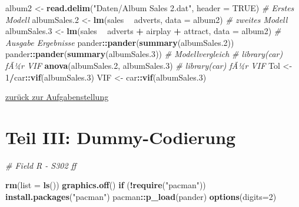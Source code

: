 \documentclass[]{article}
\newenvironment{Shaded}{\begin{snugshade}}{\end{snugshade}}
\newcommand{\CommentTok}[1]{\textcolor[rgb]{0.56,0.35,0.01}{\textit{#1}}}
\newcommand{\ControlFlowTok}[1]{\textcolor[rgb]{0.13,0.29,0.53}{\textbf{#1}}}
\newcommand{\DataTypeTok}[1]{\textcolor[rgb]{0.13,0.29,0.53}{#1}}
\newcommand{\DecValTok}[1]{\textcolor[rgb]{0.00,0.00,0.81}{#1}}
\newcommand{\FloatTok}[1]{\textcolor[rgb]{0.00,0.00,0.81}{#1}}
\newcommand{\KeywordTok}[1]{\textcolor[rgb]{0.13,0.29,0.53}{\textbf{#1}}}
\newcommand{\NormalTok}[1]{#1}
\newcommand{\OperatorTok}[1]{\textcolor[rgb]{0.81,0.36,0.00}{\textbf{#1}}}
\newcommand{\OtherTok}[1]{\textcolor[rgb]{0.56,0.35,0.01}{#1}}
\newcommand{\StringTok}[1]{\textcolor[rgb]{0.31,0.60,0.02}{#1}}
\begin{document}
\begin{Shaded}
\begin{Highlighting}[]
\NormalTok{  album2       <-}\StringTok{ }\KeywordTok{read.delim}\NormalTok{(}\StringTok{"Daten/Album Sales 2.dat"}\NormalTok{, }\DataTypeTok{header =} \OtherTok{TRUE}\NormalTok{)}
  \CommentTok{# Erstes Modell}
\NormalTok{    albumSales}\FloatTok{.2}\NormalTok{ <-}\StringTok{ }\KeywordTok{lm}\NormalTok{(sales }\OperatorTok{~}\StringTok{ }\NormalTok{adverts, }\DataTypeTok{data =}\NormalTok{ album2)}
  \CommentTok{# zweites Modell}
\NormalTok{    albumSales}\FloatTok{.3}\NormalTok{ <-}\StringTok{ }\KeywordTok{lm}\NormalTok{(sales }\OperatorTok{~}\StringTok{ }\NormalTok{adverts }\OperatorTok{+}\StringTok{ }\NormalTok{airplay }\OperatorTok{+}\StringTok{ }\NormalTok{attract, }\DataTypeTok{data =}\NormalTok{ album2)}
  \CommentTok{# Ausgabe Ergebnisse}
\NormalTok{    pander}\OperatorTok{::}\KeywordTok{pander}\NormalTok{(}\KeywordTok{summary}\NormalTok{(albumSales}\FloatTok{.2}\NormalTok{))}
\NormalTok{    pander}\OperatorTok{::}\KeywordTok{pander}\NormalTok{(}\KeywordTok{summary}\NormalTok{(albumSales}\FloatTok{.3}\NormalTok{))}
  \CommentTok{# Modellvergleich}
    \CommentTok{# library(car) fÃ¼r VIF    }
    \KeywordTok{anova}\NormalTok{(albumSales}\FloatTok{.2}\NormalTok{, albumSales}\FloatTok{.3}\NormalTok{)}
    \CommentTok{# library(car) fÃ¼r VIF    }
\NormalTok{    Tol <-}\StringTok{ }\DecValTok{1}\OperatorTok{/}\NormalTok{car}\OperatorTok{::}\KeywordTok{vif}\NormalTok{(albumSales}\FloatTok{.3}\NormalTok{)}
\NormalTok{    VIF <-}\StringTok{ }\NormalTok{car}\OperatorTok{::}\KeywordTok{vif}\NormalTok{(albumSales}\FloatTok{.3}\NormalTok{)}
\end{Highlighting}
\end{Shaded}

\protect\hyperlink{aufgabe-mlr-1}{zurück zur Aufgabenstellung}

\hypertarget{part-teil-iii-dummy-codierung}{%
\part*{Teil III: Dummy-Codierung}\label{part-teil-iii-dummy-codierung}}

\begin{Shaded}
\begin{Highlighting}[]
    \CommentTok{# Field R - S302 ff}
    
    \KeywordTok{rm}\NormalTok{(}\DataTypeTok{list =} \KeywordTok{ls}\NormalTok{())}
    \KeywordTok{graphics.off}\NormalTok{()}
    \ControlFlowTok{if}\NormalTok{ (}\OperatorTok{!}\KeywordTok{require}\NormalTok{(}\StringTok{"pacman"}\NormalTok{)) }\KeywordTok{install.packages}\NormalTok{(}\StringTok{"pacman"}\NormalTok{)}
\NormalTok{    pacman}\OperatorTok{::}\KeywordTok{p_load}\NormalTok{(pander)}
    \KeywordTok{options}\NormalTok{(}\DataTypeTok{digits=}\DecValTok{2}\NormalTok{)}
\end{Highlighting}
\end{Shaded}
\end{document}
